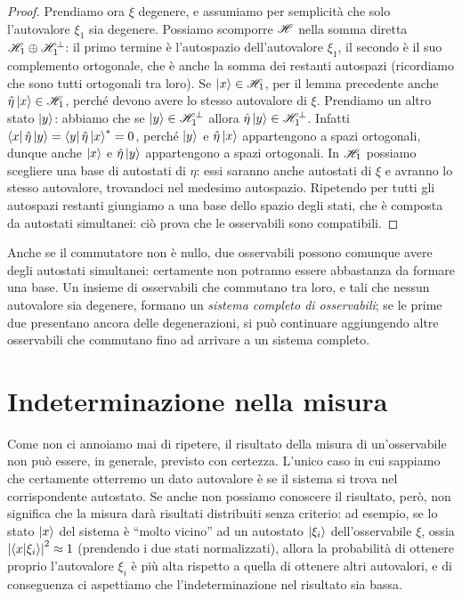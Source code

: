 \begin{proof}
	Prendiamo ora $\xi$ degenere, e assumiamo per semplicità che solo l'autovalore $\xi_1$ sia degenere.
	Possiamo scomporre $\mathscr H$ nella somma diretta $\mathscr H_1\oplus\mathscr H^\perp_1$: il primo termine è l'autospazio dell'autovalore $\xi_1$, il secondo è il suo complemento ortogonale, che è anche la somma dei restanti autospazi (ricordiamo che sono tutti ortogonali tra loro).
	Se $\left|{x}\right\rangle\in\mathscr H_1$, per il lemma precedente anche $\hat{\eta}\left|{x}\right\rangle\in\mathscr H_1$, perch\'e devono avere lo stesso autovalore di $\xi$.
	Prendiamo un altro stato $\left|{y}\right\rangle$: abbiamo che se $\left|{y}\right\rangle\in\mathscr H_1^\perp$ allora $\hat{\eta}\left|{y}\right\rangle\in\mathscr H_1^\perp$.
	Infatti $\left\langle{x}\right|\hat{\eta}\left|{y}\right\rangle=\left\langle{y}\right|\hat{\eta}\left|{x}\right\rangle^*=0$, perch\'e $\left|{y}\right\rangle$ e $\hat{\eta}\left|{x}\right\rangle$ appartengono a spazi ortogonali, dunque anche $\left|{x}\right\rangle$ e $\hat{\eta}\left|{y}\right\rangle$ appartengono a spazi ortogonali.
	In $\mathscr H_1$ possiamo scegliere una base di autostati di $\eta$: essi saranno anche autostati di $\xi$ e avranno lo stesso autovalore, trovandoci nel medesimo autospazio.
	Ripetendo per tutti gli autospazi restanti giungiamo a una base dello spazio degli stati, che è composta da autostati simultanei: ciò prova che le osservabili sono compatibili.
\end{proof}
Anche se il commutatore non è nullo, due osservabili possono comunque avere degli autostati simultanei: certamente non potranno essere abbastanza da formare una base.
Un insieme di osservabili che commutano tra loro, e tali che nessun autovalore sia degenere, formano un \emph{sistema completo di osservabili}; se le prime due presentano ancora delle degenerazioni, si può continuare aggiungendo altre osservabili che commutano fino ad arrivare a un sistema completo.


\section{Indeterminazione nella misura}
Come non ci annoiamo mai di ripetere, il risultato della misura di un'osservabile non può essere, in generale, previsto con certezza.
L'unico caso in cui sappiamo che certamente otterremo un dato autovalore è se il sistema si trova nel corrispondente autostato.
Se anche non possiamo conoscere il risultato, però, non significa che la misura darà risultati distribuiti senza criterio: ad esempio, se lo stato $\left|{x}\right\rangle$ del sistema è ``molto vicino'' ad un autostato $\left|{\xi_i}\right\rangle$ dell'osservabile $\xi$, ossia $\left|{\left\langle{x}\middle|{\xi_i}\right\rangle}\right|^2\approx 1$ (prendendo i due stati normalizzati), allora la probabilità di ottenere proprio l'autovalore $\xi_i$ è più alta rispetto a quella di ottenere altri autovalori, e di conseguenza ci aspettiamo che l'indeterminazione nel risultato sia bassa.

